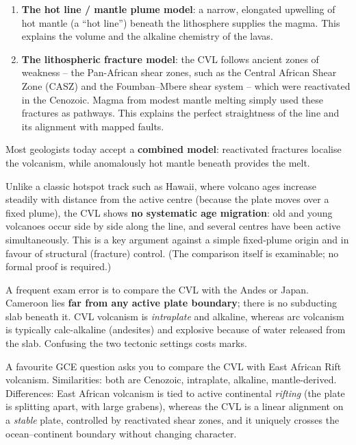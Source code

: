 \documentclass[11pt]{article}
\newcommand{\cle}[1]{{\popxbold\color{popdark}#1}}
\begin{document}
\begin{enumerate}
\item \textbf{The hot line / mantle plume model}: a narrow, elongated upwelling of hot mantle (a ``hot line'') beneath the lithosphere supplies the magma. This explains the volume and the alkaline chemistry of the lavas.
\item \textbf{The lithospheric fracture model}: the CVL follows ancient zones of weakness -- the \cle{Pan-African shear zones}, such as the Central African Shear Zone (CASZ) and the Foumban--Mbere shear system -- which were reactivated in the Cenozoic. Magma from modest mantle melting simply used these fractures as pathways. This explains the perfect straightness of the line and its alignment with mapped faults.
\end{enumerate}

Most geologists today accept a \textbf{combined model}: reactivated fractures localise the volcanism, while anomalously hot mantle beneath provides the melt.

\begin{propriete}
Unlike a classic hotspot track such as Hawaii, where volcano ages increase steadily with distance from the active centre (because the plate moves over a fixed plume), the CVL shows \textbf{no systematic age migration}: old and young volcanoes occur side by side along the line, and several centres have been active simultaneously. This is a key argument against a simple fixed-plume origin and in favour of structural (fracture) control. (The comparison itself is examinable; no formal proof is required.)
\end{propriete}

\begin{attention}
A frequent exam error is to compare the CVL with the Andes or Japan. Cameroon lies \textbf{far from any active plate boundary}; there is no subducting slab beneath it. CVL volcanism is \emph{intraplate} and alkaline, whereas arc volcanism is typically calc-alkaline (andesites) and explosive because of water released from the slab. Confusing the two tectonic settings costs marks.
\end{attention}

\begin{savaistu}
A favourite GCE question asks you to compare the CVL with East African Rift volcanism. Similarities: both are Cenozoic, intraplate, alkaline, mantle-derived. Differences: East African volcanism is tied to active continental \emph{rifting} (the plate is splitting apart, with large grabens), whereas the CVL is a linear alignment on a \emph{stable} plate, controlled by reactivated shear zones, and it uniquely crosses the ocean--continent boundary without changing character.
\end{savaistu}
\end{document}
